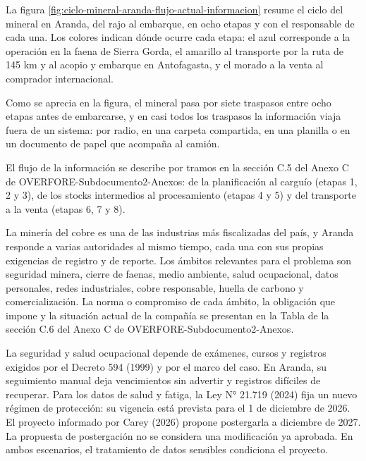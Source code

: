 \documentclass[subdoc]{../../comun/overfore}
\begin{document}
La figura \ref{fig:ciclo-mineral-aranda-flujo-actual-informacion} resume el ciclo del mineral en Aranda, del rajo al embarque, en ocho etapas y con el responsable de cada una. Los colores indican dónde ocurre cada etapa: el azul corresponde a la operación en la faena de Sierra Gorda, el amarillo al transporte por la ruta de 145 km y al acopio y embarque en Antofagasta, y el morado a la venta al comprador internacional.

Como se aprecia en la figura, el mineral pasa por siete traspasos entre ocho etapas antes de embarcarse, y en casi todos los traspasos la información viaja fuera de un sistema: por radio, en una carpeta compartida, en una planilla o en un documento de papel que acompaña al camión.

El flujo de la información se describe por tramos en la sección C.5 del Anexo C de OVERFORE-Subdocumento2-Anexos: de la planificación al carguío (etapas 1, 2 y 3), de los stocks intermedios al procesamiento (etapas 4 y 5) y del transporte a la venta (etapas 6, 7 y 8).

La minería del cobre es una de las industrias más fiscalizadas del país, y Aranda responde a varias autoridades al mismo tiempo, cada una con sus propias exigencias de registro y de reporte. Los ámbitos relevantes para el problema son seguridad minera, cierre de faenas, medio ambiente, salud ocupacional, datos personales, redes industriales, cobre responsable, huella de carbono y comercialización. La norma o compromiso de cada ámbito, la obligación que impone y la situación actual de la compañía se presentan en la Tabla  de la sección C.6 del Anexo C de OVERFORE-Subdocumento2-Anexos.

La seguridad y salud ocupacional depende de exámenes, cursos y registros exigidos por el Decreto 594 (1999) y por el marco del caso. En Aranda, su seguimiento manual deja vencimientos sin advertir y registros difíciles de recuperar. Para los datos de salud y fatiga, la Ley N° 21.719 (2024) fija un nuevo régimen de protección: su vigencia está prevista para el 1 de diciembre de 2026. El proyecto informado por Carey (2026) propone postergarla a diciembre de 2027. La propuesta de postergación no se considera una modificación ya aprobada. En ambos escenarios, el tratamiento de datos sensibles condiciona el proyecto.
\end{document}
